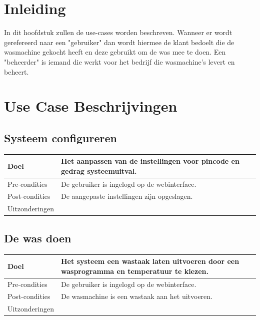 \section{Inleiding}
In dit hoofdstuk zullen de use-cases worden beschreven.
Wanneer er wordt gerefereerd naar een "gebruiker" dan wordt hiermee de klant bedoelt die de wasmachine gekocht heeft en deze gebruikt om de was mee te doen.
Een "beheerder" is iemand die werkt voor het bedrijf die wasmachine's levert en beheert.
\newpage
\section{Use Case Beschrijvingen}

\subsection{Systeem configureren}
\begin{center}
  \begin{tabular}{ | p{4cm} | p{8.5cm} | }    \hline
    Doel & Het aanpassen van de instellingen voor pincode en gedrag systeemuitval. \\ \hline
    Pre-condities & De gebruiker is ingelogd op de webinterface. \\ \hline
    Post-condities & De aangepaste instellingen zijn opgeslagen. \\ \hline
    Uitzonderingen & \\
    \hline
  \end{tabular}
\end{center}

\subsection{De was doen}
\begin{center}
  \begin{tabular}{ | p{4cm} | p{8.5cm} | }    \hline
    Doel & Het systeem een wastaak laten uitvoeren door een wasprogramma en temperatuur te kiezen. \\ \hline
    Pre-condities & De gebruiker is ingelogd op de webinterface. \\ \hline
    Post-condities & De wasmachine is een wastaak aan het uitvoeren. \\ \hline
    Uitzonderingen & \\
    \hline
  \end{tabular}
\end{center}

